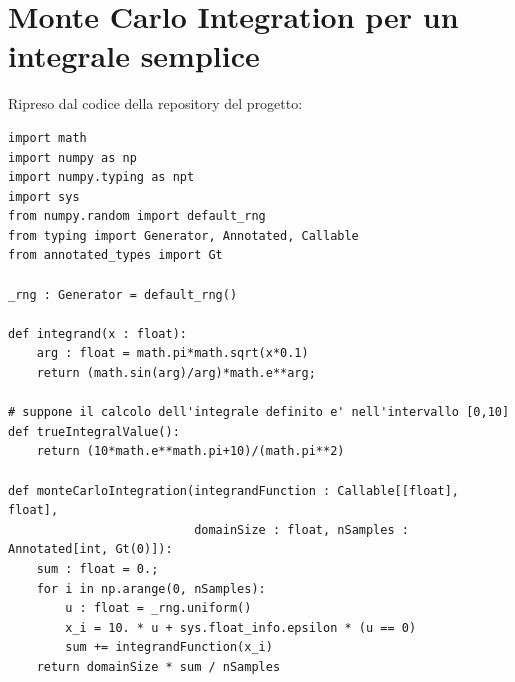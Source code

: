 \section{Monte Carlo Integration per un integrale semplice}\label{appendixD:MC}
Ripreso dal codice della repository del progetto:
\begin{verbatim}
import math
import numpy as np
import numpy.typing as npt
import sys
from numpy.random import default_rng
from typing import Generator, Annotated, Callable
from annotated_types import Gt

_rng : Generator = default_rng()

def integrand(x : float):
    arg : float = math.pi*math.sqrt(x*0.1)
    return (math.sin(arg)/arg)*math.e**arg;

# suppone il calcolo dell'integrale definito e' nell'intervallo [0,10]
def trueIntegralValue():
    return (10*math.e**math.pi+10)/(math.pi**2)

def monteCarloIntegration(integrandFunction : Callable[[float], float], 
                          domainSize : float, nSamples : Annotated[int, Gt(0)]):
    sum : float = 0.;
    for i in np.arange(0, nSamples):
        u : float = _rng.uniform()
        x_i = 10. * u + sys.float_info.epsilon * (u == 0)
        sum += integrandFunction(x_i)
    return domainSize * sum / nSamples
\end{verbatim}
